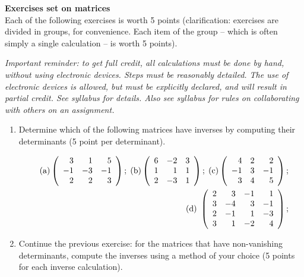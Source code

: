 \documentclass{article}
\begin{document}
{\bf Exercises set on matrices }\\

Each of the following exercises is worth 5 points (clarification: exercises are divided in groups, for convenience. Each item of the group -- which is often simply a single calculation --  is worth 5 points). 

\emph{Important reminder: to get full credit, all calculations must be done by hand, without using electronic devices. Steps must be reasonably detailed.  The use of electronic devices is allowed, but must be explicitly declared, and will result in partial credit. See syllabus for details. Also see syllabus for rules on collaborating with others on an assignment.   }  




\begin{enumerate}

\item  Determine which of the following matrices have inverses by computing their determinants (5 point per determinant). 

\begin{eqnarray*}
&&\rm{(a) }\left( 
\begin{array}{rrr}
3 & 1 & 5 \\ 
-1 & -3 & -1 \\ 
2 & 2 & 3
\end{array}
\right) ;\;\rm{(b) }\left( 
\begin{array}{rrr}
6 & -2 & 3 \\ 
1 & 1 & 1 \\ 
2 & -3 & 1
\end{array}
\right) ;\;\rm{(c) }\left( 
\begin{array}{rrr}
4 & 2 & 2 \\ 
-1 & 3 & -1 \\ 
3 & 4 & 5
\end{array}
\right) ;\; \\
&&\rm{(d)\ }\left( 
\begin{array}{rrrr}
2 & 3 & -1 & 1 \\ 
3 & -4 & 3 & -1 \\ 
2 & -1 & 1 & -3 \\ 
3 & 1 & -2 & 4
\end{array}
\right) ;\;

\end{eqnarray*}

\item Continue the previous exercise: for the matrices that have non-vanishing determinants, compute the inverses using a method of your choice (5 points for each inverse calculation). 



\end{enumerate}
\end{document}
